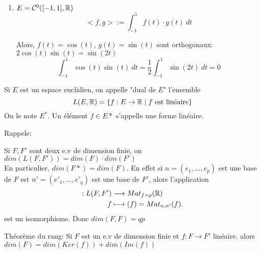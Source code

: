 \documentclass[a4paper]{report}
\begin{document}
\begin{eg}
   \begin{enumerate}
       \item $E = \mathcal{C}^0([-1, 1], \mathbb{R})$
            \[
                <f, g> := \int_{-1}^{1} f(t) \cdot g(t) \: d{t} 
            \] 
            \begin{center}
   \end{center}
   Alors, $f(t) = \cos(t)$, $g(t) = \sin(t)$ sont orthogonaux: $2\cos(t)\sin(t) = \sin(2t)$
   \[
       \int_{-1}^{1} \cos(t)\sin(t)\:d{t} = \frac{1}{2}\int_{-1}^{1} \sin(2t) \: d{t} = 0  
   \] 
   \end{enumerate} 
\end{eg}
\begin{definition}
    Si $E$ est un espace euclidien, on appelle "dual de $E$" l'ensemble
    \[
        L(E, \mathbb{R}) = \{ f: E \to \mathbb{R} \mid f \text{ est linéaire}\}
    \] 
    On le note $E^*$. Un élément  $f \in E*$ s'appelle une forme linéaire.
\end{definition}
Rappele:
\begin{prop}
    Si $F, F'$ sont deux e.v de dimension finie, on  $dim(L(F, F')) = dim(F)\cdot dim(F')$\\
    En particulier,  $dim(F*) = dim(F)$. En effet si  $n = (e_1, \ldots, e_p)$ est une base de $F$ est  $n' = (e'_1, \ldots, e'_q)$ est une base de $F'$, alors l'application
    \begin{align*}
        : L(F, F') &\longrightarrow Mat_{f\times p}(\mathbb{R}) \\
        f &\longmapsto (f) = Mat_{n,n'}(f)
    .\end{align*}
    est un isomorphisme. Donc $dim(F, F) = qp$
\end{prop}
\begin{theorem}
    Théorème du rang: Si  $F$ est un e.v de dimension finie et  $f: F \to F'$ linéaire, alors $dim(F) = dim(Ker(f)) + dim(Im(f))$
\end{theorem}
\end{document}
